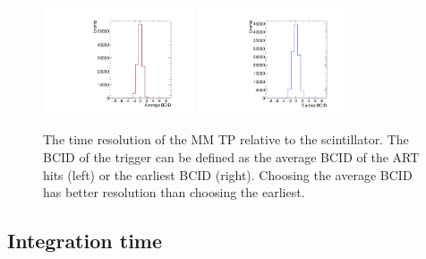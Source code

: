 \begin{figure}[!htpb]
  \begin{center}
    \includegraphics[width=0.4\textwidth]{figures/gbtanalysis3522/avg_BCID.pdf}
    \includegraphics[width=0.4\textwidth]{figures/gbtanalysis3522/earliest_BCID.pdf}
  \end{center}
  \vspace{-10pt}
  \caption{The time resolution of the MM TP relative to the scintillator. The BCID of the trigger can be defined as the average BCID of the ART hits (left) or the earliest BCID (right). Choosing the average BCID has better resolution than choosing the earliest.}
  \label{fig:timeres}
\end{figure}

\subsection{Integration time}
\label{sec:perf-integ}

